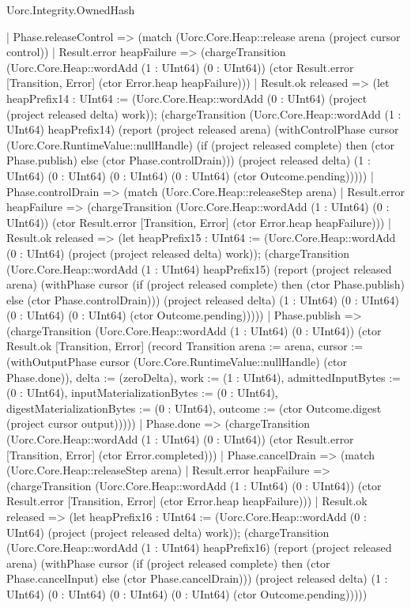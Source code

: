 \begin{lexlean}{Uorc.Integrity.OwnedHash}
\begin{semanticmodule}
{    | Phase.releaseControl => (match (Uorc.Core.Heap::release arena (project cursor control))
      | Result.error heapFailure => (chargeTransition (Uorc.Core.Heap::wordAdd (1 : UInt64) (0 : UInt64)) (ctor Result.error [Transition, Error] (ctor Error.heap heapFailure)))
      | Result.ok released => (let heapPrefix14 : UInt64 := (Uorc.Core.Heap::wordAdd (0 : UInt64) (project (project released delta) work)); (chargeTransition (Uorc.Core.Heap::wordAdd (1 : UInt64) heapPrefix14) (report (project released arena) (withControlPhase cursor (Uorc.Core.RuntimeValue::nullHandle) (if (project released complete) then (ctor Phase.publish) else (ctor Phase.controlDrain))) (project released delta) (1 : UInt64) (0 : UInt64) (0 : UInt64) (0 : UInt64) (ctor Outcome.pending)))))
    | Phase.controlDrain => (match (Uorc.Core.Heap::releaseStep arena)
      | Result.error heapFailure => (chargeTransition (Uorc.Core.Heap::wordAdd (1 : UInt64) (0 : UInt64)) (ctor Result.error [Transition, Error] (ctor Error.heap heapFailure)))
      | Result.ok released => (let heapPrefix15 : UInt64 := (Uorc.Core.Heap::wordAdd (0 : UInt64) (project (project released delta) work)); (chargeTransition (Uorc.Core.Heap::wordAdd (1 : UInt64) heapPrefix15) (report (project released arena) (withPhase cursor (if (project released complete) then (ctor Phase.publish) else (ctor Phase.controlDrain))) (project released delta) (1 : UInt64) (0 : UInt64) (0 : UInt64) (0 : UInt64) (ctor Outcome.pending)))))
    | Phase.publish => (chargeTransition (Uorc.Core.Heap::wordAdd (1 : UInt64) (0 : UInt64)) (ctor Result.ok [Transition, Error] (record Transition {arena := arena, cursor := (withOutputPhase cursor (Uorc.Core.RuntimeValue::nullHandle) (ctor Phase.done)), delta := (zeroDelta), work := (1 : UInt64), admittedInputBytes := (0 : UInt64), inputMaterializationBytes := (0 : UInt64), digestMaterializationBytes := (0 : UInt64), outcome := (ctor Outcome.digest (project cursor output))})))
    | Phase.done => (chargeTransition (Uorc.Core.Heap::wordAdd (1 : UInt64) (0 : UInt64)) (ctor Result.error [Transition, Error] (ctor Error.completed)))
    | Phase.cancelDrain => (match (Uorc.Core.Heap::releaseStep arena)
      | Result.error heapFailure => (chargeTransition (Uorc.Core.Heap::wordAdd (1 : UInt64) (0 : UInt64)) (ctor Result.error [Transition, Error] (ctor Error.heap heapFailure)))
      | Result.ok released => (let heapPrefix16 : UInt64 := (Uorc.Core.Heap::wordAdd (0 : UInt64) (project (project released delta) work)); (chargeTransition (Uorc.Core.Heap::wordAdd (1 : UInt64) heapPrefix16) (report (project released arena) (withPhase cursor (if (project released complete) then (ctor Phase.cancelInput) else (ctor Phase.cancelDrain))) (project released delta) (1 : UInt64) (0 : UInt64) (0 : UInt64) (0 : UInt64) (ctor Outcome.pending)))))
}
\end{semanticmodule}
\end{lexlean}

